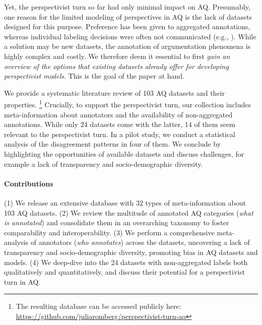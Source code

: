 Yet, the perspectivist turn so far had only minimal impact on AQ. Presumably, one reason for the limited modeling of perspectives in AQ is the lack of datasets designed for this purpose. Preference has been given to aggregated annotations, whereas individual labeling decisions were often not communicated (e.g., \citealt{persing-ng-2013-modeling, park-cardie-2018-corpus, toledo-etal-2019-automatic, ijcai2022p575}). While a solution may be new datasets, the annotation of argumentation phenomena is highly complex and costly. We therefore deem it essential to first \textit{gain an overview of the options that existing datasets already offer for developing perspectivist models}. This is the goal of the paper at hand. 

We provide a systematic literature review of 103 AQ {datasets and their properties}.%
\footnote{The resulting database can be accessed publicly here: \href{https://github.com/juliaromberg/perspectivist-turn-aq}{https://github.com/juliaromberg/perspectivist-turn-aq}}
Crucially, to support the perspectivist turn, our collection includes meta-information about annotators and the availability of non-aggregated annotations. While only 24 datasets come with the latter, 14 of them seem relevant to the perspectivist turn. In a pilot study, we conduct a statistical analysis of the disagreement patterns in four of them. We conclude by highlighting the opportunities of available datasets and discuss challenges, for example a lack of transparency and socio-demographic diversity.

\paragraph{Contributions}
(1) We release an extensive database with 32 types of meta-information about 103 AQ datasets. (2) We review the multitude of annotated AQ categories %
(\textit{what is annotated}) and consolidate them in an overarching taxonomy to foster comparability and interoperability.
(3) We perform a comprehensive meta-analysis of annotators (\textit{who annotates}) across the datasets, uncovering a lack of transparency and socio-demographic diversity, promoting bias in AQ datasets and models.
(4) We deep-dive into the 24 datasets with non-aggregated labels both qualitatively and quantitatively, and discuss their potential for a perspectivist turn in AQ.
